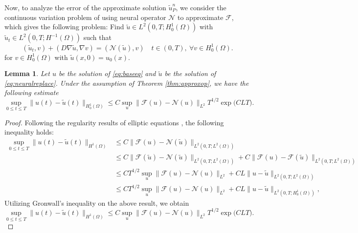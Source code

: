 \documentclass[preprint,12pt]{elsarticle}
\theoremstyle{plain}
\newtheorem{lemma}[theorem]{Lemma}
\numberwithin{figure}{section}
\numberwithin{table}{section}
\begin{document}
Now, to analyze the error of the approximate solution $\widetilde{u}_P^n$, we consider the continuous variation problem of using  neural operator $\mathcal{N}$ to approximate $\mathcal{F}$, which gives the following problem: Find $\widetilde{u}\in L^2(0,T;H_0^1(\Omega))$ with $\widetilde{u}_t\in L^2(0,T;H^{-1}(\Omega))$ such that
\begin{equation}
	\label{eq:neuralreplace}
	(\widetilde{u}_t,v) + (D\nabla \widetilde{u},\nabla v) = (\mathcal{N}(\widetilde{u}),v)\quad t\in (0,T), ~ \forall v \in H_0^1(\Omega).
\end{equation}
for $ v \in H_0^1(\Omega)$ with $\widetilde{u}(x,0) = u_0(x)$.


\begin{lemma}\label{lem:err-sol}
	Let $u$ be the solution of \eqref{eq:baseeq} and $\widetilde{u}$ be the solution of \eqref{eq:neuralreplace}. Under the assumption of Theorem \ref{thm:approxop}, we have the following estimate
	\begin{equation}
		\underset{0 \leq t \leq T}{ \sup }	\|u(t)-\widetilde{u}(t)\|_{H_0^1(\Omega)} \le C\sup_{u}\|\mathcal{F}(u)-\mathcal{N}(u)\|_{L^2} T^{1/2}\exp \big(CLT\big).
	\end{equation}
\end{lemma}

\begin{proof}
	Following the regularity results of elliptic equations \cite{evans2022partial}, the following inequality holds:
	\begin{equation}
		\begin{aligned}
			\underset{0 \leq t \leq T}{ \sup }\|u(t)-\widetilde{u}(t)\|_{H^1(\Omega)}
			& \leq C\|\mathcal{F}(u)-\mathcal{N}(\widetilde{u})\|_{L^2\left(0, T ; L^2(\Omega)\right)}\\
			& \leq C\|\mathcal{F}(\widetilde{u})-\mathcal{N}(\widetilde{u})\|_{L^2\left(0, T ; L^2(\Omega)\right)}+C\|\mathcal{F}(u)-\mathcal{F}(\widetilde{u})\|_{L^2\left(0, T ; L^2(\Omega)\right)}\\
			&\leq C T^{1/2}\sup_{u}\|\mathcal{F}(u)-\mathcal{N}(u)\|_{L^2}+CL\|u-\widetilde{u}\|_{L^2(0, T ; L^2(\Omega))}\\
			&\leq C T^{1/2}\sup_{u}\|\mathcal{F}(u)-\mathcal{N}(u)\|_{L^2}+CL\|u-\widetilde{u}\|_{L^2(0, T ; H^1_0(\Omega))},
		\end{aligned}
	\end{equation}
	Utilizing Gronwall’s inequality on the above result, we obtain
	\begin{equation}
		\underset{0 \leq t \leq T}{ \sup }	\|u(t)-\widetilde{u}(t)\|_{H^1(\Omega)} \le C\sup_{u}\|\mathcal{F}(u)-\mathcal{N}(u)\|_{L^2} T^{1/2}\exp \big(CLT\big).
	\end{equation}
\end{proof}
\end{document}
